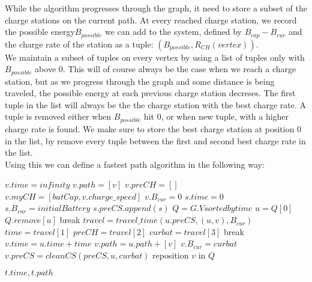 While the algorithm progresses through the graph, it need to store a subset of the charge stations on the current path. At every reached charge station, we record the possible energy$B_{possible}$ we can add to the system, defined by $B_{cap}-B_{cur}$ and the charge rate of the station as a tuple: $(B_{possible}, R_{CH}(vertex))$.\\
We maintain a subset of tuples on every vertex by using a list of tuples only with $B_{possible}$ above 0. This will of course always be the case when we reach a charge station, but as we progress through the graph and some distance is being traveled, the possible energy at each previous charge station decreses. The first tuple in the list will always be the the charge station with the best charge rate. A tuple is removed either when $B_{possible}$ hit 0, or when new tuple, with a higher charge rate is found. We make sure to store the best charge station at position 0 in the list, by remove every tuple between the first and second best charge rate in the list.\\

Using this we can define a fastest path algorithm in the following way: \\

\begin{algorithmic}
    		\State $v.time = infinity$
		\State $v.path = [v]$
    		\State $v.preCH = []$
		\State $v.myCH = [batCap, v.charge\_speed]$
		\State $v.B_{cur} = 0$
    	\EndFor
	\State $s.time = 0$
	\State $s.B_{cur} = initialBattery$
	\State $s.preCS.append(s)$	
	\State $Q = G.V sorted by time$
		\State $u = Q[0]$
		\State $Q.remove[u]$
		 break \EndIf
			\State $travel = travel\_time(u.preCS, (u, v), B_{cur})$
			\State $time = travel[1]$
			\State $preCH = travel[2]$
			\State $curbat = travel[3]$
			 break \EndIf
				\State $v.time = u.time + time$
				\State $v.path = u.path + [v]$
				\State $v.B_{cur} = curbat$
				\State $v.preCS = cleanCS(preCS, u, curbat)$
				\State reposition $v$ in $Q$
			\EndIf

		\EndFor
	\EndWhile
	\State \Return $t.time, t.path$
\EndFunction
\end{algorithmic}\label{alg:fastest_path}
